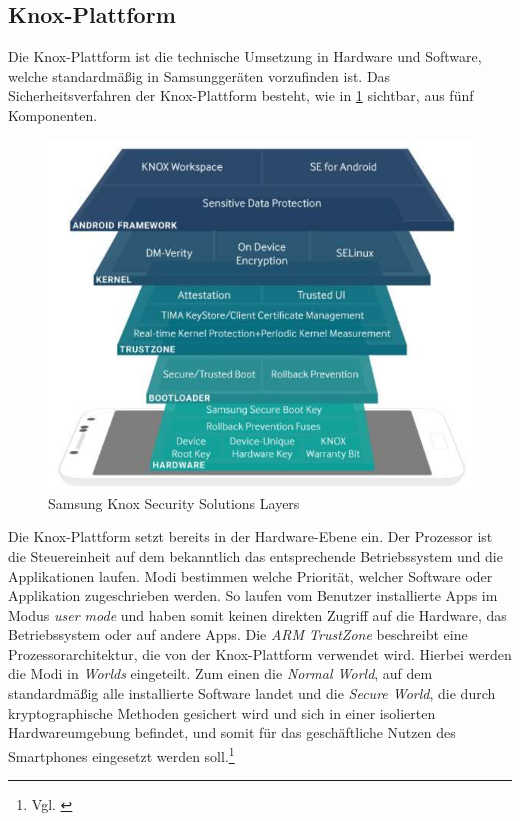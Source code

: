 \subsection{Knox-Plattform}
Die Knox-Plattform ist die technische Umsetzung in Hardware und Software, welche standardmäßig in Samsunggeräten vorzufinden ist. Das Sicherheitsverfahren der Knox-Plattform besteht, wie in \cref{fig:SamKno1} sichtbar, aus fünf Komponenten.
\begin{figure}[hbt]
\centering
\includegraphics[width=1\textwidth]{Bilder/sk_1}
\caption{Samsung Knox Security Solutions Layers}\label{fig:SamKno1}
\end{figure}
Die Knox-Plattform setzt bereits in der Hardware-Ebene ein. Der Prozessor ist die Steuereinheit auf dem bekanntlich das entsprechende Betriebssystem und die Applikationen laufen. Modi bestimmen welche Priorität, welcher Software oder Applikation zugeschrieben werden. So laufen vom Benutzer installierte Apps im Modus \textit{user mode} und haben somit keinen direkten Zugriff auf die Hardware, das Betriebssystem oder auf andere Apps. Die \textit{ARM TrustZone} beschreibt eine Prozessorarchitektur, die von der Knox-Plattform verwendet wird. Hierbei werden die Modi in \textit{Worlds} eingeteilt. Zum einen die \textit{Normal World}, auf dem standardmäßig alle installierte Software landet und die \textit{Secure World}, die durch kryptographische Methoden gesichert wird und sich in einer isolierten Hardwareumgebung befindet, und somit für das geschäftliche Nutzen des Smartphones eingesetzt werden soll.\footnote{Vgl. \cite{sam2017c}}

